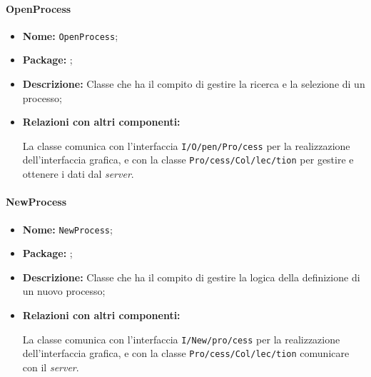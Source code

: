 \paragraph{OpenProcess}
\begin{flushleft}
\begin{itemize}
\item \textbf{Nome:} \texttt{OpenProcess};
\item \textbf{Package:} \texttt{\logicAdmin{}};
\item \textbf{Descrizione:} Classe che ha il compito di gestire la ricerca e la selezione di un processo;
\item \textbf{Relazioni con altri componenti:}
\begin{sloppypar}
La classe comunica con l'interfaccia \texttt{\viewAdmin{}I\fshyp{}O\fshyp{}pen\fshyp{}Pro\fshyp{}cess} per la realizzazione dell'interfaccia grafica, e con la classe \texttt{\collection{}Pro\fshyp{}cess\fshyp{}Col\fshyp{}lec\fshyp{}tion} per gestire e ottenere i dati dal \textit{server}.
\end{sloppypar}
\end{itemize}
\end{flushleft}

\paragraph{NewProcess}
\begin{flushleft}
\begin{itemize}
\item \textbf{Nome:} \texttt{NewProcess};
\item \textbf{Package:} \texttt{\logicAdmin{}};
\item \textbf{Descrizione:} Classe che ha il compito di gestire la logica della definizione di un nuovo processo;
\item \textbf{Relazioni con altri componenti:}
\begin{sloppypar}
La classe comunica con l'interfaccia \texttt{\viewAdmin{}I\fshyp{}New\fshyp{}pro\fshyp{}cess} per la realizzazione dell'interfaccia grafica, e con la classe \texttt{\collection{}Pro\fshyp{}cess\fshyp{}Col\fshyp{}lec\fshyp{}tion} comunicare con il \textit{server}.
\end{sloppypar}
\end{itemize}
\end{flushleft}


